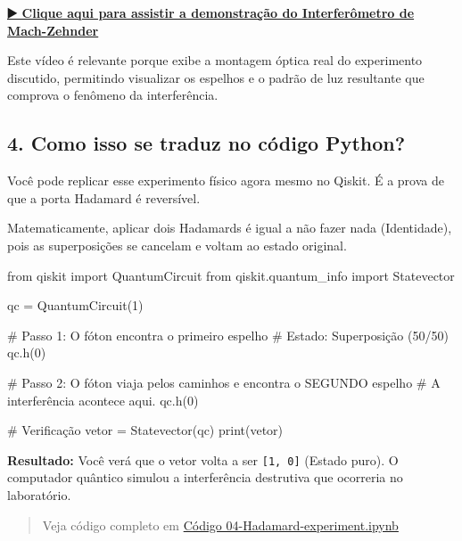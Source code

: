 \documentclass[
  brazilian,
]{report}
\newenvironment{Shaded}{\begin{snugshade}}{\end{snugshade}}
\newcommand{\BuiltInTok}[1]{\textcolor[rgb]{0.00,0.23,0.31}{#1}}
\newcommand{\CommentTok}[1]{\textcolor[rgb]{0.37,0.37,0.37}{#1}}
\newcommand{\DecValTok}[1]{\textcolor[rgb]{0.68,0.00,0.00}{#1}}
\newcommand{\ImportTok}[1]{\textcolor[rgb]{0.00,0.46,0.62}{#1}}
\newcommand{\NormalTok}[1]{\textcolor[rgb]{0.00,0.23,0.31}{#1}}
\newcommand{\OperatorTok}[1]{\textcolor[rgb]{0.37,0.37,0.37}{#1}}
\begin{document}
\textbf{\href{https://www.youtube.com/watch?v=M3Y2hwsJgos}{▶️ Clique
aqui para assistir a demonstração do Interferômetro de Mach-Zehnder}}

Este vídeo é relevante porque exibe a montagem óptica real do
experimento discutido, permitindo visualizar os espelhos e o padrão de
luz resultante que comprova o fenômeno da interferência.

\subsection{4. Como isso se traduz no código
Python?}\label{como-isso-se-traduz-no-cuxf3digo-python}

Você pode replicar esse experimento físico agora mesmo no Qiskit. É a
prova de que a porta Hadamard é reversível.

Matematicamente, aplicar dois Hadamards é igual a não fazer nada
(Identidade), pois as superposições se cancelam e voltam ao estado
original.

\begin{Shaded}
\begin{Highlighting}[]
\ImportTok{from}\NormalTok{ qiskit }\ImportTok{import}\NormalTok{ QuantumCircuit}
\ImportTok{from}\NormalTok{ qiskit.quantum\_info }\ImportTok{import}\NormalTok{ Statevector}

\NormalTok{qc }\OperatorTok{=}\NormalTok{ QuantumCircuit(}\DecValTok{1}\NormalTok{)}

\CommentTok{\# Passo 1: O fóton encontra o primeiro espelho}
\CommentTok{\# Estado: Superposição (50/50)}
\NormalTok{qc.h(}\DecValTok{0}\NormalTok{) }

\CommentTok{\# Passo 2: O fóton viaja pelos caminhos e encontra o SEGUNDO espelho}
\CommentTok{\# A interferência acontece aqui.}
\NormalTok{qc.h(}\DecValTok{0}\NormalTok{)}

\CommentTok{\# Verificação}
\NormalTok{vetor }\OperatorTok{=}\NormalTok{ Statevector(qc)}
\BuiltInTok{print}\NormalTok{(vetor)}
\end{Highlighting}
\end{Shaded}

\textbf{Resultado:} Você verá que o vetor volta a ser
\texttt{{[}1,\ 0{]}} (Estado puro). O computador quântico simulou a
interferência destrutiva que ocorreria no laboratório.

\begin{quote}
Veja código completo em \href{04-Hadamard-experiment.ipynb}{Código
04-Hadamard-experiment.ipynb}
\end{quote}
\end{document}

